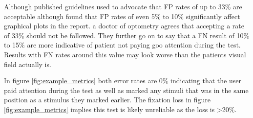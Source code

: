 \documentclass{l4proj}
\begin{document}
Although published guidelines used to advocate that FP rates of up to 33\% are acceptable although \citet{Heijl2021PerimetryPrimer} found that FP rates of even 5\%  to 10\% significantly affect graphical plots in the report. \citet{Chaglasian2013} a doctor of optometry agrees that accepting a rate of 33\% should not be followed. They further go on to say that a FN result of 10\% to 15\% are more indicative of patient not paying goo attention during the test. Results with FN rates around this value may look worse than the patients visual field actually is.

In figure \ref{fig:example_metrics} both error rates are 0\% indicating that the user paid attention during the test as well as marked any stimuli that was in the same position as a stimulus they marked earlier. The fixation loss in figure \ref{fig:example_metrics} implies this test is likely unreliable as the loss is >20\%. 
\end{document}
